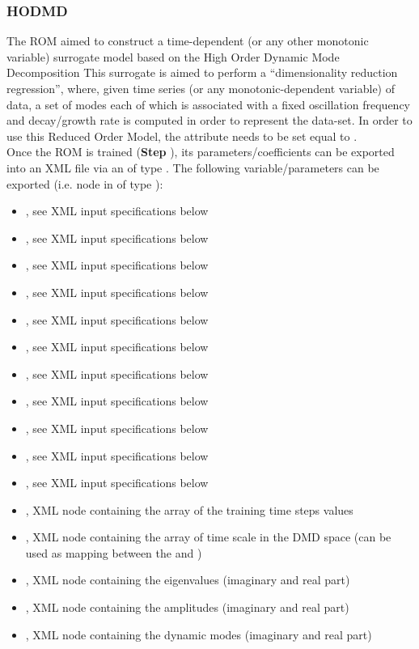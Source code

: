 \subsubsection{HODMD}
  The  ROM aimed to construct a time-dependent (or any other monotonic
  variable) surrogate model based on the High Order Dynamic Mode Decomposition     This surrogate is
  aimed to perform a ``dimensionality reduction regression'', where, given time     series (or any
  monotonic-dependent variable) of data, a set of modes each of which is associated     with a fixed
  oscillation frequency and decay/growth rate is computed     in order to represent the data-set.
  In order to use this Reduced Order Model, the  attribute      needs
  to be set equal to .     \\     Once the ROM  is trained (\textbf{Step}
  ), its parameters/coefficients can be exported into an XML file     via an
   of type . The following variable/parameters can be exported
  (i.e.  node     in  of type ):     \begin{itemize}
  \item {}, see XML input specifications below       \item {},
  see XML input specifications below       \item {}, see XML input specifications below
  \item {}, see XML input specifications below       \item {}, see
  XML input specifications below       \item {}, see XML input
  specifications below       \item {}, see XML input specifications below       \item
  , see XML input specifications below       \item
  , see XML input specifications below       \item
  , see XML input specifications below       \item {}, see
  XML input specifications below       \item {}, XML node containing the array of
  the training time steps values       \item {}, XML node containing the array
  of time scale in the DMD space (can be used as mapping       between the   and
  )       \item {}, XML node containing the eigenvalues (imaginary
  and real part)       \item {}, XML node containing the amplitudes (imaginary and
  real part)       \item {}, XML node containing the dynamic modes (imaginary and real
  part)     \end{itemize}

